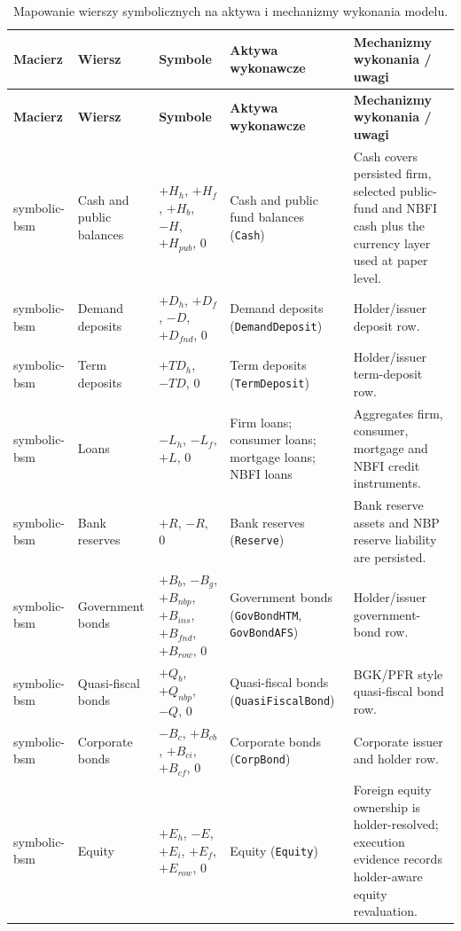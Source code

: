 \begin{landscape}
\tiny
\begin{longtable}{@{}L{2.4cm}L{3.2cm}L{4.2cm}L{4.6cm}L{7.0cm}@{}}
\caption{Mapowanie wierszy symbolicznych na aktywa i mechanizmy wykonania modelu.}
\label{tab:appendix-mapping}\\
\toprule
\textbf{Macierz} & \textbf{Wiersz} & \textbf{Symbole} & \textbf{Aktywa wykonawcze} & \textbf{Mechanizmy wykonania / uwagi} \\
\midrule
\endfirsthead
\toprule
\textbf{Macierz} & \textbf{Wiersz} & \textbf{Symbole} & \textbf{Aktywa wykonawcze} & \textbf{Mechanizmy wykonania / uwagi} \\
\midrule
\endhead
symbolic-bsm & Cash and public balances & $+H_h$, $+H_f$, $+H_b$, $-H$, $+H_{pub}$, $0$ & Cash and public fund balances (\texttt{Cash}) & Cash covers persisted firm, selected public-fund and NBFI cash plus the currency layer used at paper level. \\
symbolic-bsm & Demand deposits & $+D_h$, $+D_f$, $-D$, $+D_{fnd}$, $0$ & Demand deposits (\texttt{DemandDeposit}) & Holder/issuer deposit row. \\
symbolic-bsm & Term deposits & $+TD_h$, $-TD$, $0$ & Term deposits (\texttt{TermDeposit}) & Holder/issuer term-deposit row. \\
symbolic-bsm & Loans & $-L_h$, $-L_f$, $+L$, $0$ & Firm loans; consumer loans; mortgage loans; NBFI loans & Aggregates firm, consumer, mortgage and NBFI credit instruments. \\
symbolic-bsm & Bank reserves & $+R$, $-R$, $0$ & Bank reserves (\texttt{Reserve}) & Bank reserve assets and NBP reserve liability are persisted. \\
symbolic-bsm & Government bonds & $+B_b$, $-B_g$, $+B_{nbp}$, $+B_{ins}$, $+B_{fnd}$, $+B_{row}$, $0$ & Government bonds (\texttt{GovBondHTM}, \texttt{GovBondAFS}) & Holder/issuer government-bond row. \\
symbolic-bsm & Quasi-fiscal bonds & $+Q_b$, $+Q_{nbp}$, $-Q$, $0$ & Quasi-fiscal bonds (\texttt{QuasiFiscalBond}) & BGK/PFR style quasi-fiscal bond row. \\
symbolic-bsm & Corporate bonds & $-B_c$, $+B_{cb}$, $+B_{ci}$, $+B_{cf}$, $0$ & Corporate bonds (\texttt{CorpBond}) & Corporate issuer and holder row. \\
symbolic-bsm & Equity & $+E_h$, $-E$, $+E_i$, $+E_f$, $+E_{row}$, $0$ & Equity (\texttt{Equity}) & Foreign equity ownership is holder-resolved; execution evidence records holder-aware equity revaluation. \\

\end{longtable}
\end{landscape}
